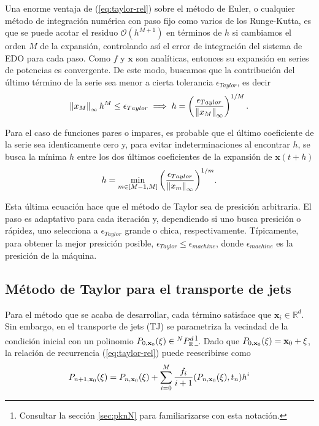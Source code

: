 Una enorme ventaja de (\ref{eq:taylor-rel}) sobre el método de Euler, o cualquier método de integración numérica con paso fijo como varios de los Runge-Kutta, es que se puede acotar el residuo $\mathcal{O}(h^{M+1})$ en términos de $h$ si cambiamos el orden $M$ de la expansión, controlando así el error de integración del sistema de EDO para cada paso. Como $f$ y $\mathbf{x}$ son analíticas, entonces su expansión en series de potencias es convergente. De este modo, buscamos que la contribución del último término de la serie sea menor a cierta tolerancia $\epsilon_{Taylor}$, es decir
\begin{equation*}
\left\lVert x_M\right\rVert_\infty h^M \leq \epsilon_{Taylor} \implies h = \left( \frac{\epsilon_{Taylor}}{\left\lVert x_M\right\rVert_\infty} \right)^{1/M}.
\end{equation*} 

Para el caso de funciones pares o impares, es probable que el último coeficiente de la serie sea identicamente cero y, para evitar indeterminaciones al encontrar $h$, se busca la mínima $h$ entre los dos últimos coeficientes de la expansión de $\mathbf{x}(t+h)$
\begin{equation}
h = \min_{m \in [M-1,M]}{ \left( \frac{\epsilon_{Taylor}}{\left\lVert x_m\right\rVert_\infty} \right)^{1/m} }.
\label{eq:stepsize}
\end{equation} 

Esta última ecuación hace que el método de Taylor sea de presición arbitraria. El paso es adaptativo para cada iteración y, dependiendo si uno busca presición o rápidez, uno selecciona a $\epsilon_{Taylor}$ grande o chica, respectivamente. Típicamente, para obtener la mejor presición posible, $\epsilon_{Taylor} \leq \epsilon_{machine}$, donde $\epsilon_{machine}$ es la presición de la máquina.


\subsection{Método de Taylor para el transporte de jets}
Para el método que se acaba de desarrollar, cada término satisface que $\mathbf{x}_i \in \mathbb{R}^d$. Sin embargo, en el transporte de jets (TJ) se parametriza la vecindad de la condición inicial con un polinomio $P_{0,\mathbf{x}_0}(\mathbf{\xi}) \in {^{N}P_{\mathbb{R}}^ d }$\footnote{Consultar la sección \ref{sec:pknN} para familiarizarse con esta notación.}. Dado que $P_{0,\mathbf{x}_0}(\mathbf{\xi}) = \mathbf{x}_0 + \mathbf{\xi}$, la relación de recurrencia (\ref{eq:taylor-rel}) puede reescribirse como
\begin{equation}
P_{n+1,\mathbf{x}_0}(\xi) = P_{n,\mathbf{x}_0}(\xi) + \sum_{i=0}^M \frac{f_i}{i+1}(P_{n,\mathbf{x}_0}(\xi),t_n)h^i 
\label{eq:jt-rel}
\end{equation}

